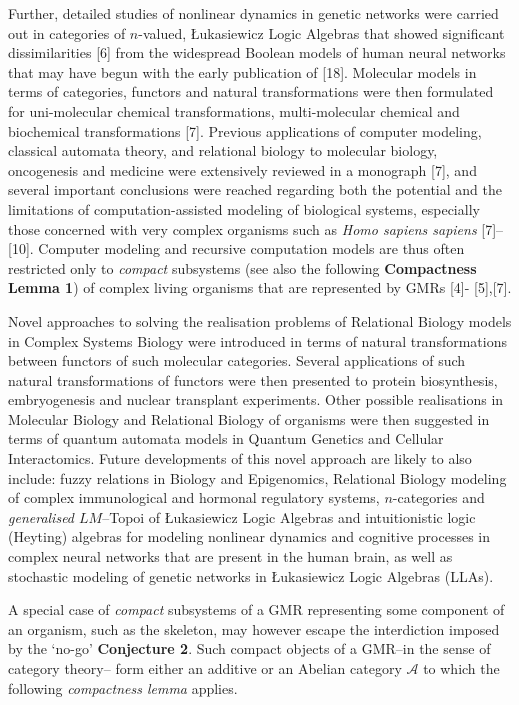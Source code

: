 \documentclass[12pt]{article}
\theoremstyle{plain}
\theoremstyle{definition}
\numberwithin{equation}{section}
\begin{document}
Further, detailed studies of nonlinear dynamics in genetic networks were carried out in categories of $n$-valued, \L{}ukasiewicz Logic Algebras that showed significant dissimilarities [6] from the widespread Boolean models of human neural networks that may have begun with the early publication of [18]. Molecular models in terms of categories, functors and natural transformations were then formulated for uni-molecular chemical transformations, multi-molecular chemical and biochemical transformations [7]. Previous applications of computer modeling, classical automata theory, and relational biology to molecular biology, oncogenesis and medicine were extensively reviewed in a monograph [7], and several important conclusions were reached regarding both the potential and the limitations of computation-assisted modeling of biological systems, especially those concerned with very complex organisms such as \emph{Homo sapiens sapiens} [7]-- [10]. Computer modeling and recursive computation models are thus often restricted only to \emph{compact} subsystems (see also the following \textbf{Compactness Lemma 1})  of complex living organisms that are represented by GMRs [4]- [5],[7].

Novel approaches to solving the realisation problems of Relational Biology models in Complex Systems Biology were introduced in terms of natural transformations between functors of such molecular categories. Several applications of such natural transformations of functors were then presented to protein biosynthesis, embryogenesis and nuclear transplant experiments. Other possible realisations in Molecular Biology and Relational Biology of organisms were then suggested in terms of quantum automata models in Quantum Genetics and Cellular Interactomics. Future developments of this novel approach are likely to also include: fuzzy relations in Biology and Epigenomics, Relational Biology modeling of complex immunological and hormonal regulatory systems, $n$-categories and \emph{generalised $LM$}--Topoi of \L{}ukasiewicz Logic Algebras and intuitionistic logic (Heyting) algebras for modeling nonlinear dynamics and cognitive processes in complex neural networks that are present in the human brain, as well as stochastic modeling of genetic networks in \L{}ukasiewicz Logic Algebras (LLAs).


A special case of \emph{compact} subsystems of a GMR representing some component of an organism, such as the skeleton, may however escape the interdiction imposed by the `no-go' \textbf{Conjecture 2}. Such compact objects of a GMR--in the sense of category theory-- form either an additive  or an Abelian category $\mathcal{A}$  to which the following \emph{compactness lemma} applies.
\end{document}
